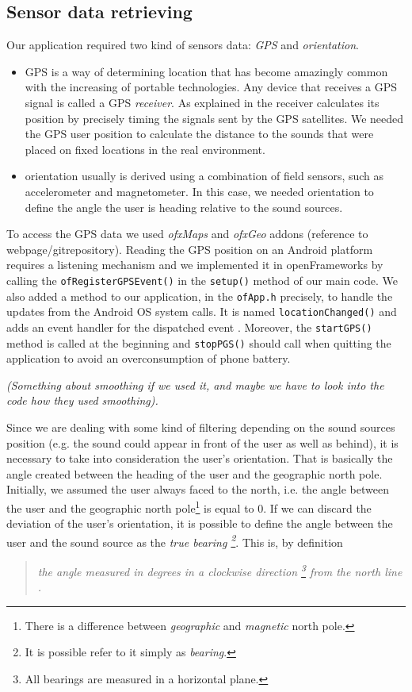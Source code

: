 \documentclass[journal]{IEEEtran}
\begin{document}
\subsection{Sensor data retrieving}
Our application required two kind of sensors data: \emph{GPS} and \emph{orientation}. 
\begin{itemize}  
\item GPS is a way of determining location that has become amazingly common with the increasing of portable technologies. Any device that receives a GPS signal is 	called a GPS \emph{receiver}. As explained in \cite{} the receiver calculates its position by precisely timing the signals sent by the GPS satellites.
We needed the GPS user position to calculate the distance to the sounds that were placed on fixed locations in the real environment. 
\item orientation usually is derived using a combination of field sensors, such as accelerometer and magnetometer. 
In this case, we needed orientation to define the angle the user is heading relative to the sound sources.
\end{itemize}

To access the GPS data we used \emph{ofxMaps} and \emph{ofxGeo} addons (reference to webpage/gitrepository). Reading the GPS position on an Android platform requires a listening mechanism and we implemented it in openFrameworks by calling the \texttt{ofRegisterGPSEvent()} in the \texttt{setup()} method of our main code. We also added a method to our application, in the \texttt{ofApp.h} precisely, to handle the updates from the Android OS system calls. It is named \texttt{locationChanged()} and adds an event handler for the dispatched event \cite{}. Moreover, the \texttt{startGPS()} method is called at the beginning and \texttt{stopPGS()} should call when quitting the application to avoid an overconsumption of phone battery.

{\footnotesize \textit{(Something about smoothing if we used it, and maybe we have to look into the code how they used smoothing).}}

Since we are dealing with some kind of filtering depending on the sound sources position (e.g. the sound could appear in front of the user as well as behind), it is necessary to take into consideration the user's orientation. That is basically the angle created between the heading of the user and the geographic north pole. Initially, we assumed the user always faced to the north, i.e. the angle between the user and the geographic north pole\footnote{There is a difference between \emph{geographic} and \emph{magnetic} north pole.} is equal to 0. If we can discard the deviation of the user's orientation, it is possible to define the angle between the user and the sound source as the \emph{true bearing \footnote{It is possible refer to it simply as \emph{bearing}.}}. This is, by definition
\begin{quote}
{\footnotesize{\textit{the angle measured in degrees in a clockwise direction \footnote{All bearings are measured in a horizontal plane.} from the north line \cite{}.}}}
\end{quote}
\end{document}
